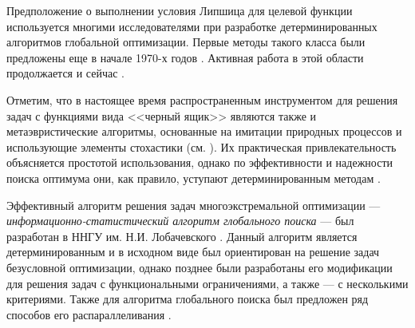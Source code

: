 \documentclass{cmi1}
\begin{document}
Предположение о выполнении условия Липшица для целевой функции используется многими исследователями при разработке детерминированных алгоритмов глобальной оптимизации.
Первые методы такого класса были предложены еще в начале 1970-х годов . Активная работа в этой области продолжается и сейчас .


Отметим, что в настоящее время распространенным инструментом для решения задач с функциями вида <<черный ящик>> являются также и метаэвристические алгоритмы, основанные на имитации природных процессов и использующие элементы стохастики (см. ). Их практическая привлекательность объясняется простотой использования, однако по эффективности и надежности поиска оптимума они, как правило, уступают детерминированным методам .



Эффективный алгоритм решения задач многоэкстремальной оптимизации --- \textit{информационно-статистический алгоритм глобального поиска} --- был разработан в ННГУ им. Н.И. Лобачевского . 
Данный алгоритм является детерминированным и в исходном виде был ориентирован на решение задач безусловной оптимизации, однако позднее были разработаны его модификации для решения задач с функциональными ограничениями, а также --- с несколькими критериями. 
Также для алгоритма глобального поиска был предложен ряд способов его распараллеливания .
\end{document}
